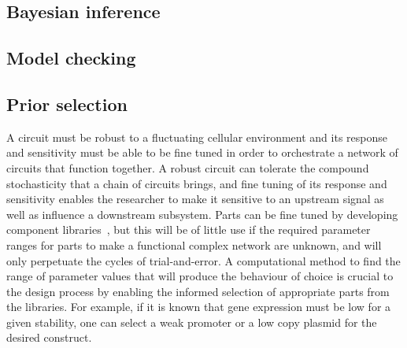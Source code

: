 \subsection{Bayesian inference}
\subsection{Model checking}
\subsection{Prior selection}

A circuit must be robust to a fluctuating cellular environment and its response and sensitivity must be able to be fine tuned in order to orchestrate a network of circuits that function together. A robust circuit can tolerate the compound stochasticity that a chain of circuits brings, and fine tuning of its response and sensitivity enables the researcher to make it sensitive to an upstream signal as well as influence a downstream subsystem. Parts can be fine tuned by developing component libraries~\autocite{Lu:2009ez,}, but this will be of little use if the required parameter ranges for parts to make a functional complex network are unknown, and will only perpetuate the cycles of trial-and-error. A computational method to find the range of parameter values that will produce the behaviour of choice is crucial to the design process by enabling the informed selection of appropriate parts from the libraries. For example, if it is known that gene expression must be low for a given stability, one can select a weak promoter or a low copy plasmid for the desired construct. 

